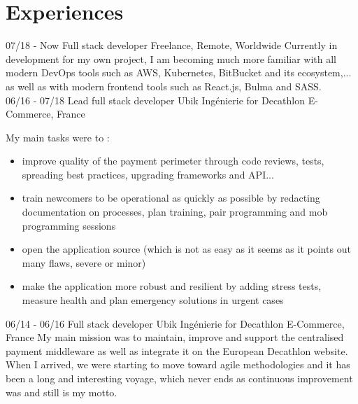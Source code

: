 \documentclass[]{friggeri-cv}
\begin{document}
\section{Experiences}
\begin{entrylist}
  \entry
    {07/18 - Now}
    {Full stack developer}
    {Freelance, Remote, Worldwide}
    {Currently in development for my own project, I am becoming much more familiar with all modern DevOps tools such as AWS, Kubernetes, BitBucket and its ecosystem,... as well as with modern frontend tools such as React.js, Bulma and SASS.\\}
    \entry
    {06/16 - 07/18}
    {Lead full stack developer}
    {Ubik Ingénierie for Decathlon E-Commerce, France}
    {
My main tasks were to :
      \begin{itemize}
        \item improve quality of the payment perimeter through code reviews, tests, spreading best practices, upgrading frameworks and API...
        \item train newcomers to be operational as quickly as possible by redacting documentation on processes, plan training, pair programming and mob programming sessions
        \item open the application source (which is not as easy as it seems as it points out many flaws, severe or minor)
        \item make the application more robust and resilient by adding stress tests, measure health and plan emergency solutions in urgent cases
      \end{itemize}
}
    \entry
    {06/14 - 06/16}
    {Full stack developer}
    {Ubik Ingénierie for Decathlon E-Commerce, France}
    {My main mission was to maintain, improve and support the centralised payment middleware as well as integrate it on the European Decathlon website.\\
When I arrived, we were starting to move toward agile methodologies and it has been a long and interesting voyage, which never ends as continuous improvement was and still is my motto.\\}
\end{entrylist}
\end{document}
